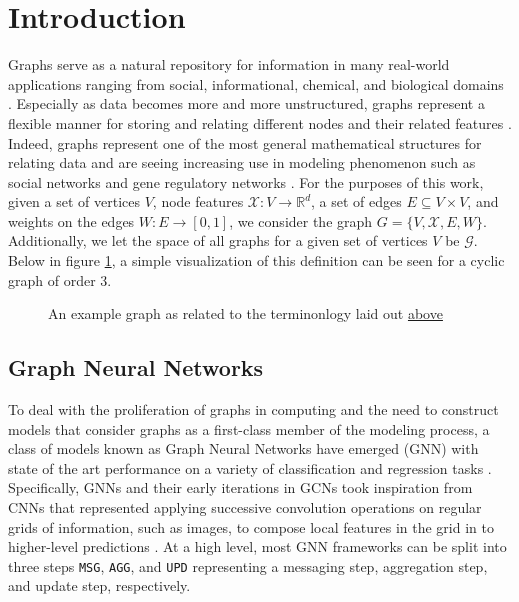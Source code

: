\section{Introduction}
\label{sec:intro}
Graphs serve as a natural repository for information in many real-world applications ranging from social, informational, chemical, and biological domains \cite{cho_friendship_2011}. Especially as data becomes more and more unstructured, graphs represent a flexible manner for storing and relating different nodes and their related features \cite{washio_state_2003}. Indeed, graphs represent one of the most general mathematical structures for relating data and are seeing increasing use in modeling phenomenon such as social networks and gene regulatory networks \cite{washio_state_2003,petralia_new_2016}. For the purposes of this work, given a set of vertices $V$, node features $\mathcal{X} : V \rightarrow \mathbb{R}^{d}$, a set of edges $E \subseteq V \times V$, and weights on the edges $W : E \rightarrow [0,1]$, we consider the graph $G = \{V, \mathcal{X}, E, W\}$. Additionally, we let the space of all graphs for a given set of vertices $V$ be $\mathcal{G}$. Below in figure \ref{fig:graph_ex}, a simple visualization of this definition can be seen for a cyclic graph of order 3.
\begin{figure}[b]
  \centering
  
  \caption{An example graph as related to the terminonlogy laid out \hyperref[sec:intro]{above}}
  \label{fig:graph_ex}
\end{figure}

\subsection{Graph Neural Networks}
To deal with the proliferation of graphs in computing and the need to construct models that consider graphs as a first-class member of the modeling process, a class of models known as Graph Neural Networks have emerged (GNN) with state of the art performance on a variety of classification and regression tasks \cite{ying_gnnexplainer_2019}. Specifically, GNNs and their early iterations in GCNs took inspiration from CNNs that represented applying successive convolution operations on regular grids of information, such as images, to compose local features in the grid in to higher-level predictions \cite{defferrard_convolutional_2017}. At a high level, most GNN frameworks can be split into three steps \verb|MSG|, \verb|AGG|, and \verb|UPD| representing a messaging step, aggregation step, and update step, respectively.

